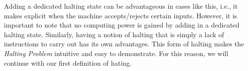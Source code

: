 \documentclass[../../include/open-logic-section]{subfiles}
\begin{document}
\begin{explain}
Adding a dedicated halting state can be advantageous in cases like this,
i.e., it makes explicit when the machine accepts/rejects certain inputs.
However, it is important to note that no computing power is gained by
adding in a dedicated halting state. Similarly, having a notion of halting
that is simply a lack of instructions to carry out has its own advantages.
This form of halting makes the \emph{Halting Problem} intuitive and easy
to demonstrate. For this reason, we will continue with our first definition
of hating.
\end{explain}
\end{document}
